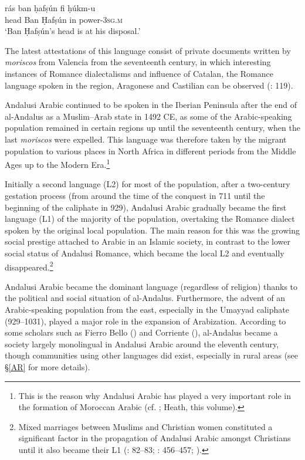 \documentclass[output=paper,modfonts,nonflat]{langsci/langscibook}
\begin{document}
\ex
\gll rás ban ḥafṣún fi ḥúkm-u \\
head Ban Ḥafṣún in power-\textsc{3sg.m}\\
\glt ‘Ban Ḥafṣún’s head is at his disposal.’
\z
\z

The latest attestations of this language consist of private documents written by \textit{moriscos} from Valencia from the seventeenth century, in which interesting instances of Romance dialectalisms and influence of Catalan, the Romance language spoken in the region, Aragonese and Castilian can be observed (\citealt{BarcelóLabarta2009}: 119).

Andalusi Arabic continued to be spoken in the Iberian Peninsula after the end of al-Andalus as a Muslim–Arab state in 1492 CE, as some of the Arabic-speaking population remained in certain regions up until the seventeenth century, when the last \textit{moriscos} were expelled. This language was therefore taken by the migrant population to various places in North Africa in different periods from the Middle Ages up to the Modern Era.\footnote{This is the reason why Andalusi Arabic has played a very important role in the formation of Moroccan Arabic (cf. \citealt{Vicente2010}; Heath, this volume).} 

Initially a second language (L2) for most of the population, after a two-century gestation process (from around the time of the conquest in 711 until the beginning of the caliphate in 929), Andalusi Arabic gradually became the first language (L1) of the majority of the population, overtaking the Romance dialect spoken by the original local population. The main reason for this was the growing social prestige attached to Arabic in an Islamic society, in contrast to the lower social status of Andalusi Romance, which became the local L2 and eventually disappeared.\footnote{Mixed marriages between Muslims and Christian women constituted a significant factor in the propagation of Andalusi Arabic amongst Christians until it also became their L1 (\citealt{Guichard1989}: 82–83; \citeyear{Guichard1995}: 456–457; \citealt{Chalmeta2003}).}  

Andalusi Arabic became the dominant language (regardless of religion) thanks to the political and social situation of al-Andalus. Furthermore, the advent of an Arabic-speaking population from the east, especially in the Umayyad caliphate (929--1031), played a major role in the expansion of Arabization. According to some scholars such as Fierro Bello (\citeyear{FierroBello2001}) and Corriente (\citeyear[104]{Corriente2008}), al-Andalus became a society largely monolingual in Andalusi Arabic around the eleventh century, though communities using other languages did exist, especially in rural areas (see §\ref{AR} for more details). 
\end{document}
